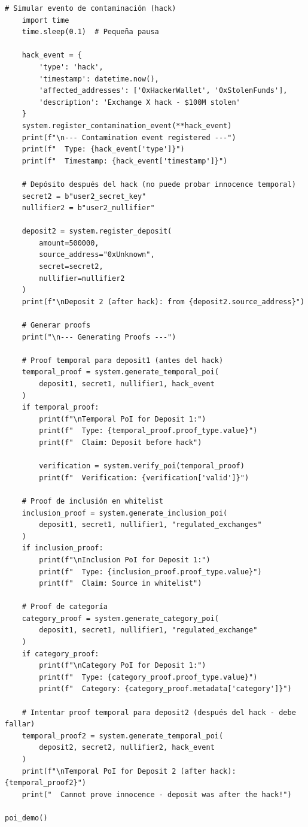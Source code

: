 \documentclass[11pt,a4paper,twoside]{book}
\theoremstyle{definition}
\theoremstyle{remark}
\begin{document}
\begin{lstlisting}[language=circom, caption={Circuito de Proof-of-Innocence temporal}]
    # Simular evento de contaminación (hack)
    import time
    time.sleep(0.1)  # Pequeña pausa
    
    hack_event = {
        'type': 'hack',
        'timestamp': datetime.now(),
        'affected_addresses': ['0xHackerWallet', '0xStolenFunds'],
        'description': 'Exchange X hack - $100M stolen'
    }
    system.register_contamination_event(**hack_event)
    print(f"\n--- Contamination event registered ---")
    print(f"  Type: {hack_event['type']}")
    print(f"  Timestamp: {hack_event['timestamp']}")
    
    # Depósito después del hack (no puede probar innocence temporal)
    secret2 = b"user2_secret_key"
    nullifier2 = b"user2_nullifier"
    
    deposit2 = system.register_deposit(
        amount=500000,
        source_address="0xUnknown",
        secret=secret2,
        nullifier=nullifier2
    )
    print(f"\nDeposit 2 (after hack): from {deposit2.source_address}")
    
    # Generar proofs
    print("\n--- Generating Proofs ---")
    
    # Proof temporal para deposit1 (antes del hack)
    temporal_proof = system.generate_temporal_poi(
        deposit1, secret1, nullifier1, hack_event
    )
    if temporal_proof:
        print(f"\nTemporal PoI for Deposit 1:")
        print(f"  Type: {temporal_proof.proof_type.value}")
        print(f"  Claim: Deposit before hack")
        
        verification = system.verify_poi(temporal_proof)
        print(f"  Verification: {verification['valid']}")
    
    # Proof de inclusión en whitelist
    inclusion_proof = system.generate_inclusion_poi(
        deposit1, secret1, nullifier1, "regulated_exchanges"
    )
    if inclusion_proof:
        print(f"\nInclusion PoI for Deposit 1:")
        print(f"  Type: {inclusion_proof.proof_type.value}")
        print(f"  Claim: Source in whitelist")
    
    # Proof de categoría
    category_proof = system.generate_category_poi(
        deposit1, secret1, nullifier1, "regulated_exchange"
    )
    if category_proof:
        print(f"\nCategory PoI for Deposit 1:")
        print(f"  Type: {category_proof.proof_type.value}")
        print(f"  Category: {category_proof.metadata['category']}")
    
    # Intentar proof temporal para deposit2 (después del hack - debe fallar)
    temporal_proof2 = system.generate_temporal_poi(
        deposit2, secret2, nullifier2, hack_event
    )
    print(f"\nTemporal PoI for Deposit 2 (after hack): {temporal_proof2}")
    print("  Cannot prove innocence - deposit was after the hack!")

poi_demo()
\end{lstlisting}
\end{document}
